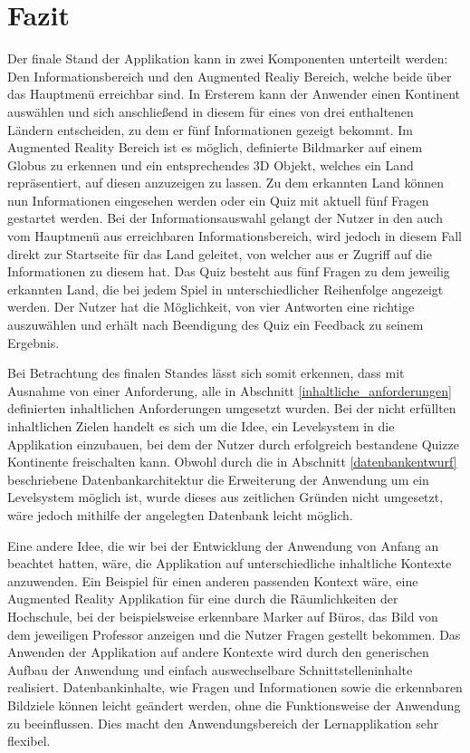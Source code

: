 \chapter{Fazit}\label{ch:fazit}
Der finale Stand der Applikation kann in zwei Komponenten unterteilt werden: Den Informationsbereich und den Augmented Realiy Bereich, welche beide über das Hauptmenü erreichbar sind.
In Ersterem kann der Anwender einen Kontinent auswählen und sich anschließend in diesem für eines von drei enthaltenen Ländern entscheiden, zu dem er fünf Informationen gezeigt bekommt.
Im Augmented Reality Bereich ist es möglich, definierte Bildmarker auf einem Globus zu erkennen und ein entsprechendes 3D Objekt, welches ein Land repräsentiert, auf diesen anzuzeigen zu lassen.
Zu dem erkannten Land können nun Informationen eingesehen werden oder ein Quiz mit aktuell fünf Fragen gestartet werden. 
Bei der Informationsauswahl gelangt der Nutzer in den auch vom Hauptmenü aus erreichbaren Informationsbereich, wird jedoch in diesem Fall direkt zur Startseite für das Land geleitet, von welcher aus er Zugriff auf die Informationen zu diesem hat.
Das Quiz besteht aus fünf Fragen zu dem jeweilig erkannten Land, die bei jedem Spiel in unterschiedlicher Reihenfolge angezeigt werden.
Der Nutzer hat die Möglichkeit, von vier Antworten eine richtige auszuwählen und erhält nach Beendigung des Quiz ein Feedback zu seinem Ergebnis.

Bei Betrachtung des finalen Standes lässt sich somit erkennen, dass mit Ausnahme von einer Anforderung, alle in Abschnitt \ref{inhaltliche_anforderungen} definierten inhaltlichen Anforderungen umgesetzt wurden.
Bei der nicht erfüllten inhaltlichen Zielen handelt es sich um die Idee, ein Levelsystem in die Applikation einzubauen, bei dem der Nutzer durch erfolgreich bestandene Quizze Kontinente freischalten kann.
Obwohl durch die in Abschnitt \ref{datenbankentwurf} beschriebene Datenbankarchitektur die Erweiterung der Anwendung um ein Levelsystem möglich ist, wurde dieses aus zeitlichen Gründen nicht umgesetzt, wäre jedoch mithilfe der angelegten Datenbank leicht möglich.

Eine andere Idee, die wir bei der Entwicklung der Anwendung von Anfang an beachtet hatten, wäre, die Applikation auf unterschiedliche inhaltliche Kontexte anzuwenden.
Ein Beispiel für einen anderen passenden Kontext wäre, eine Augmented Reality Applikation für eine  durch die Räumlichkeiten der Hochschule, bei der beispielsweise erkennbare Marker auf Büros, das Bild von dem jeweiligen Professor anzeigen und die Nutzer Fragen gestellt bekommen.
Das Anwenden der Applikation auf andere Kontexte wird durch den generischen Aufbau der Anwendung und einfach auswechselbare Schnittstelleninhalte realisiert.
Datenbankinhalte, wie Fragen und Informationen sowie die erkennbaren Bildziele können leicht geändert werden, ohne die Funktionsweise der Anwendung zu beeinflussen. Dies macht den Anwendungsbereich der Lernapplikation sehr flexibel.

